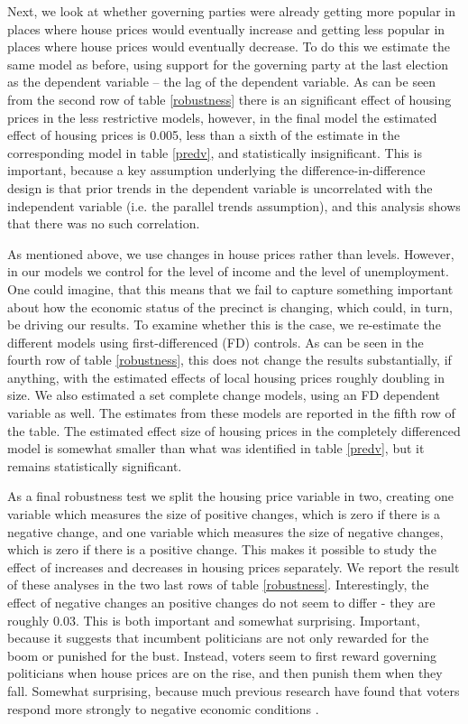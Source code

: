 \documentclass[12pt,a4paper]{article}
\begin{document}
Next, we look at whether  governing parties were already getting more popular in places where house prices would eventually increase and getting less popular in places where house prices would eventually decrease. To do this we estimate the same model as before, using support for the governing party at the last election as the dependent variable -- the lag of the dependent variable. As can be seen from the second row of table \ref{robustness} there is an significant effect of housing prices in the less restrictive models, however, in the final model the estimated effect of housing prices is 0.005, less than a sixth of the estimate in the corresponding model in table \ref{predv}, and statistically insignificant. This is important, because a key assumption underlying the difference-in-difference design is that prior trends in the dependent variable is uncorrelated with the independent variable  (i.e. the parallel trends assumption), and this analysis shows that there was no such correlation.

As mentioned above, we use changes in house prices rather than levels. However, in our models we control for the level of income and the level of unemployment. One could imagine, that this means that we fail to capture something important about how the economic status of the precinct is changing, which could, in turn, be driving our results. To examine whether this is the case, we re-estimate the different models using first-differenced (FD) controls. As can be seen in the fourth row of table \ref{robustness}, this does not change the results substantially, if anything, with the estimated effects of local housing prices roughly doubling in size. We also estimated a set complete change models, using an FD dependent variable as well. The estimates from these models are reported in the fifth row of the table. The estimated effect size of housing prices in the completely differenced model is somewhat smaller than what was identified in table \ref{predv}, but it remains statistically significant.

As a final robustness test we split the housing price variable in two, creating one variable which measures the size of positive changes, which is zero if there is a negative change, and one variable which measures the size of negative changes, which is zero if there is a positive change. This makes it possible to study the effect of increases and decreases in housing prices separately. We report the result of these analyses in the two last rows of table \ref{robustness}. Interestingly, the effect of negative changes an positive changes do not seem to differ - they are roughly 0.03. This is both important and somewhat surprising. Important, because it suggests that incumbent politicians are not only rewarded for the boom or punished for the bust. Instead, voters seem to first reward governing politicians when house prices are on the rise, and then punish them when they fall. Somewhat surprising, because much previous research have found that voters respond more strongly to negative economic conditions \citep[e.g.][]{bloom1975voter,headrick1991attention,soroka2014negativity}.
\end{document}
